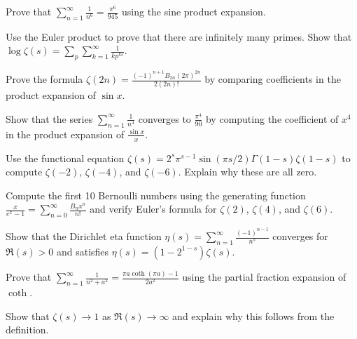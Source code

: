 \begin{exercise}
Prove that $\sum_{n=1}^{\infty} \frac{1}{n^6} = \frac{\pi^6}{945}$ using the sine product expansion.
\end{exercise}

\begin{exercise}
Use the Euler product to prove that there are infinitely many primes. Show that $\log \zeta(s) = \sum_p \sum_{k=1}^\infty \frac{1}{k p^{ks}}$.
\end{exercise}

\begin{exercise}
Prove the formula $\zeta(2n) = \frac{(-1)^{n+1} B_{2n} (2\pi)^{2n}}{2(2n)!}$ by comparing coefficients in the product expansion of $\sin x$.
\end{exercise}

\begin{exercise}
Show that the series $\sum_{n=1}^\infty \frac{1}{n^4}$ converges to $\frac{\pi^4}{90}$ by computing the coefficient of $x^4$ in the product expansion of $\frac{\sin x}{x}$.
\end{exercise}

\begin{exercise}
Use the functional equation $\zeta(s) = 2^s \pi^{s-1} \sin(\pi s/2) \Gamma(1-s) \zeta(1-s)$ to compute $\zeta(-2)$, $\zeta(-4)$, and $\zeta(-6)$. Explain why these are all zero.
\end{exercise}

\begin{exercise}
Compute the first 10 Bernoulli numbers using the generating function $\frac{x}{e^x - 1} = \sum_{n=0}^\infty \frac{B_n x^n}{n!}$ and verify Euler's formula for $\zeta(2)$, $\zeta(4)$, and $\zeta(6)$.
\end{exercise}

\begin{exercise}
Show that the Dirichlet eta function $\eta(s) = \sum_{n=1}^\infty \frac{(-1)^{n-1}}{n^s}$ converges for $\Re(s) > 0$ and satisfies $\eta(s) = (1 - 2^{1-s})\zeta(s)$.
\end{exercise}

\begin{exercise}
Prove that $\sum_{n=1}^\infty \frac{1}{n^2 + a^2} = \frac{\pi a \coth(\pi a) - 1}{2a^2}$ using the partial fraction expansion of $\coth$.
\end{exercise}

\begin{exercise}
Show that $\zeta(s) \to 1$ as $\Re(s) \to \infty$ and explain why this follows from the definition.
\end{exercise}


